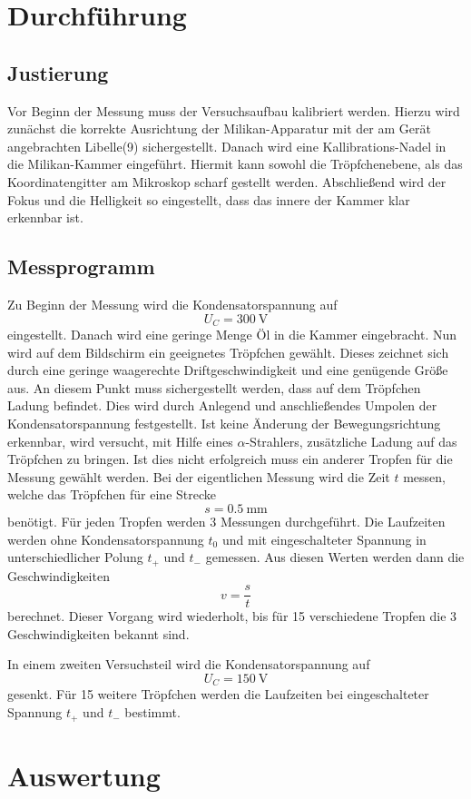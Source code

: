 \documentclass[11pt,ngerman,a4paper]{article}
\begin{document}
\section{Durchführung}
\subsection{Justierung}
Vor Beginn der Messung muss der Versuchsaufbau kalibriert werden. Hierzu wird zunächst die korrekte Ausrichtung der Milikan-Apparatur mit der am Gerät angebrachten Libelle(9) sichergestellt. Danach wird eine Kallibrations-Nadel in die Milikan-Kammer eingeführt. Hiermit kann sowohl die Tröpfchenebene, als das Koordinatengitter am Mikroskop scharf gestellt werden. Abschließend wird der Fokus und die Helligkeit so eingestellt, dass das innere der Kammer klar erkennbar ist.
\subsection{Messprogramm}
Zu Beginn der Messung wird die Kondensatorspannung auf 
\[
U_C = \SI{300}{\volt}
\]
eingestellt. Danach wird  eine geringe Menge Öl in die Kammer eingebracht. Nun wird auf dem Bildschirm ein geeignetes Tröpfchen gewählt. Dieses zeichnet sich durch eine geringe waagerechte Driftgeschwindigkeit und eine genügende Größe aus. An diesem Punkt muss sichergestellt werden, dass auf dem Tröpfchen Ladung befindet. Dies wird durch Anlegend und anschließendes Umpolen der Kondensatorspannung festgestellt. Ist keine Änderung der Bewegungsrichtung erkennbar, wird versucht, mit Hilfe eines $\alpha$-Strahlers, zusätzliche Ladung auf das Tröpfchen zu bringen. Ist dies nicht erfolgreich muss ein anderer Tropfen für die Messung gewählt werden.
Bei der eigentlichen Messung wird die Zeit $t$ messen, welche das Tröpfchen für eine Strecke
\[
s = \SI{0.5}{\milli\meter}
\]
benötigt. Für jeden Tropfen werden 3 Messungen durchgeführt. Die Laufzeiten werden ohne Kondensatorspannung $t_0$ und mit eingeschalteter Spannung in unterschiedlicher Polung $t_+$ und $t_-$ gemessen. Aus diesen Werten werden dann die Geschwindigkeiten
\[
v = \frac{s}{t}
\]
berechnet. Dieser Vorgang wird wiederholt, bis für 15 verschiedene Tropfen die 3 Geschwindigkeiten bekannt sind.

In einem zweiten Versuchsteil wird die Kondensatorspannung auf 
\[
U_C = \SI{150}{\volt}
\]
gesenkt. Für 15 weitere Tröpfchen werden die Laufzeiten bei eingeschalteter Spannung $t_+$ und $t_-$ bestimmt.
\section{Auswertung}
\end{document}
